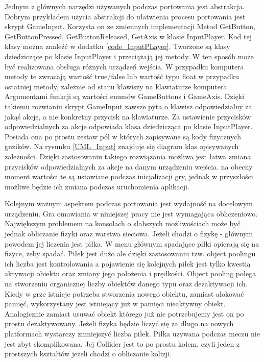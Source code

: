 \documentclass[a4paper,12pt,twoside,openany]{report}
\begin{document}
Jednym z głównych narzędzi używanych podczas portowania jest abstrakcja. Dobrym przykładem użycia abstrakcji do ułatwienia procesu portowania jest skrypt GameInput. Korzysta on ze zmiennych implementacji Metod GetButton, GetButtonPressed, GetButtonReleased, GetAxis w klasie InputPlayer. Kod tej klasy można znaleźć w dodatku \ref{code_InputPLayer}. Tworzone są klasy dziedziczące po  klasie InputPlayer i przeciążają jej metody. W ten sposób może być realizowana obsługa różnych urządzeń wejścia. W przypadku komputera metody te zwracają wartość true/false lub wartość typu float w przypadku ostatniej metody, zależnie od stanu klawiszy na klawiaturze komputera. Argumentami funkcji są wartości enumów GameButtons i GameAxis. Dzięki takiemu rozwianiu skrypt GameInput zawsze pyta o klawisz odpowiedzialny za jakąś akcje, a nie konkretny przycisk na klawiaturze. Za ustawienie przycisków odpowiedzialnych za akcje odpowiada klasa dziedzicząca po klasie InputPlayer. Posiada ona po prostu zestaw pól w których zapisywane są kody fizycznych guzików. Na rysunku \ref{UML_Input} znajduje się diagram klas opisywanych zależności. Dzięki zastosowaniu takiego rozwiązania możliwa jest łatwa zmiana przycisków odpowiedzialnych za akcje na danym urządzeniu wejścia. na obecny moment wartości te są ustawiane podczas inicjalizacji gry, jednak w przyszłości możliwe będzie ich zmiana podczas uruchomienia aplikacji.

Kolejnym ważnym aspektem podczas portowania jest wydajność na docelowym urządzeniu. Gra omawiania w niniejszej pracy nie jest wymagająca obliczeniowo. Największym problemem na konsolach o słabszych możliwościach może być jednak obliczanie fizyki oraz warstwa sieciowa. Jeżeli chodzi o fizykę - głównym powodem jej liczenia jest piłka. W menu głównym spadające piłki opierają się na fizyce, żeby spadać. Piłek jest dużo ale dzięki zastosowaniu tzw. object poolingu ich liczba jest kontrolowania a pojawienie się kolejnych piłek jest tylko kwestią aktywacji obiektu oraz zmiany jego położenia i prędkości. Object pooling polega na stworzeniu organicznej liczby obiektów danego typu oraz dezaktywacji ich. Kiedy w grze istnieje potrzeba stworzenia nowego obiektu, zamiast alokować pamięć, wykorzystany jest istniejący już w pamięci nieaktywny obiekt. Analogicznie zamiast usuwać obiekt którego już nie potrzebujemy jest on po prostu dezaktywowany. Jeżeli fizyka będzie liczyć się za długo na nowych platformach wystarczy zmniejszyć liczba piłek. Piłka używana podczas meczu nie jest zbyt skomplikowana. Jej Collider jest to po prostu kołem, czyli jeden z prostszych kształtów jeżeli chodzi o obliczanie kolizji.
\end{document}
